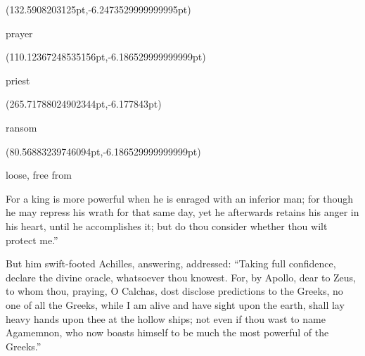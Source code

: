 \documentclass{ransom}
\begin{document}
\begin{foreignpage}
{\begin{textblock*}{42.74962pt}(132.5908203125pt,\pdfpageheight-206.37759399414062pt-6.2473529999999995pt)\parbox[b]{42.74962pt}{\begin{blacktext}\begin{latin}prayer\end{latin}\end{blacktext}}\end{textblock*}
\begin{textblock*}{48.24849pt}(110.12367248535156pt,\pdfpageheight-179.37759399414062pt-6.186529999999999pt)\parbox[b]{48.24849pt}{\begin{blacktext}\begin{latin}priest\end{latin}\end{blacktext}}\end{textblock*}
\begin{textblock*}{89.28211975097656pt}(265.71788024902344pt,\pdfpageheight-152.37759399414062pt-6.177843pt)\parbox[b]{89.28211975097656pt}{\begin{blacktext}\begin{latin}ransom\end{latin}\end{blacktext}}\end{textblock*}
\begin{textblock*}{41.60764pt}(80.56883239746094pt,\pdfpageheight-152.37759399414062pt-6.186529999999999pt)\parbox[b]{41.60764pt}{\begin{blacktext}\begin{latin}loose, free from\end{latin}\end{blacktext}}\end{textblock*}
 }
\end{foreignpage}


For a king is
more powerful when he is enraged with an inferior man; for though he
may repress his wrath for that same day, yet he afterwards retains
his anger in his heart, until he accomplishes it; but do thou consider
whether thou wilt protect me.”

But him swift-footed Achilles, answering, addressed: “Taking full
confidence, declare the divine oracle, whatsoever thou knowest. For, by
Apollo, dear to Zeus, to whom thou, praying, O Calchas, dost disclose
predictions to the Greeks, no one of all the Greeks, while I am alive
and have sight upon the earth, shall lay heavy hands upon thee at the
hollow ships; not even if thou wast to name Agamemnon, who now boasts
himself to be much the most powerful of the Greeks.”
\end{document}
